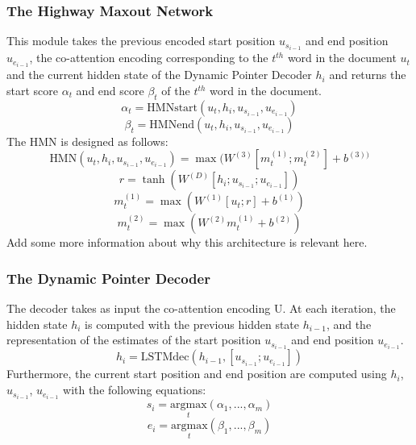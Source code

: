 \documentclass[letterpaper, 10 pt, conference]{ieeeconf}  %
\newcommand{\LSTMdec}{\text{LSTMdec}}
\newcommand{\HMN}{\text{HMN}}
\newcommand{\HMNstart}{\text{HMNstart}}
\newcommand{\HMNend}{\text{HMNend}}
\begin{document}
\subsubsection{The Highway Maxout Network}
This module takes the previous encoded start position $u_{s_{i-1}}$ and end position $u_{e_{i-1}}$, the co-attention encoding corresponding to the $t^{th}$ word in the document $u_{t}$ and the current hidden state of the Dynamic Pointer Decoder $h_i$ and returns the start score $\alpha_t$ and end score $\beta_t$ of the $t^{th}$ word in the document.
\begin{equation}
\alpha_t= \HMNstart(u_t,h_i,u_{s_{i-1}},u_{e_{i-1}})
\end{equation}
\begin{equation}
\beta_t= \HMNend(u_t,h_i,u_{s_{i-1}},u_{e_{i-1}})
\end{equation}
The HMN is designed as follows:
\begin{equation}
\HMN(u_t,h_i,u_{s_{i-1}},u_{e_{i-1}})=  \max(W^{(3)}[m^{(1)}_t;m^{(2)}_t]+b^{(3))}
\end{equation}
\begin{equation}
r=  \tanh(W^{(D)}[h_i;u_{s_{i-1}};u_{e_{i-1}}])
\end{equation}
\begin{equation}
m^{(1)}_t=  \max(W^{(1)}[u_t;r] +b^{(1)})
\end{equation}
\begin{equation}
m^{(2)}_t=  \max(W^{(2)}m^{(1)}_t+b^{(2)})
\end{equation}
Add some more information about why this architecture is relevant here.\\

\subsubsection{The Dynamic Pointer Decoder}

The decoder takes as input the co-attention encoding U. At each iteration, the hidden state $h_i$ is computed with the previous hidden state $h_{i-1}$, and the representation of the estimates of the start position $u_{s_{i-1}}$ and end position $u_{e_{i-1}}$.
\begin{equation}
h_i= \LSTMdec(h_{i-1},[u_{s_{i-1}};u_{e_{i-1}}])
\end{equation}
Furthermore, the current start position and end position are computed using $h_i$, $u_{s_{i-1}}$, $u_{e_{i-1}}$ with the following equations: 
\begin{equation}
s_i= \underset{t}{\mathrm{argmax}}(\alpha_1,...,\alpha_m)
\end{equation}
\begin{equation}
e_i= \underset{t}{\mathrm{argmax}}(\beta_1,...,\beta_m)
\end{equation}
\end{document}
